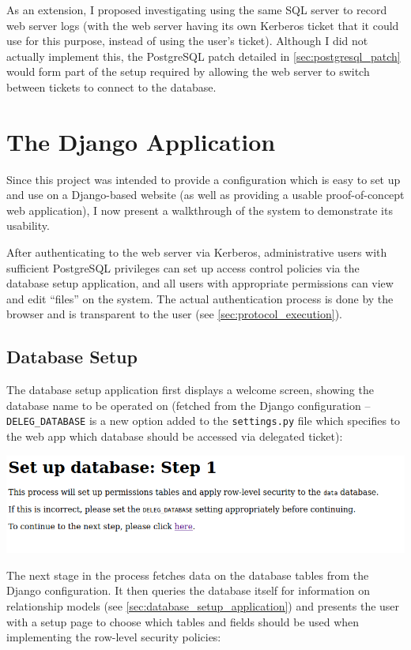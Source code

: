 \documentclass[12pt]{report}
\begin{document}
As an extension, I proposed investigating using the same SQL server to record web server logs (with the web server having its own Kerberos ticket that it could use for this purpose, instead of using the user's ticket). Although I did not actually implement this, the PostgreSQL patch detailed in \autoref{sec:postgresql_patch} would form part of the setup required by allowing the web server to switch between tickets to connect to the database.

\section{The Django Application}
Since this project was intended to provide a configuration which is easy to set up and use on a Django-based website (as well as providing a usable proof-of-concept web application), I now present a walkthrough of the system to demonstrate its usability.

After authenticating to the web server via Kerberos, administrative users with sufficient PostgreSQL privileges can set up access control policies via the database setup application, and all users with appropriate permissions can view and edit ``files'' on the system. The actual authentication process is done by the browser and is transparent to the user (see \autoref{sec:protocol_execution}).

\subsection{Database Setup}
The database setup application first displays a welcome screen, showing the database name to be operated on (fetched from the Django configuration -- \verb+DELEG_DATABASE+ is a new option added to the \verb+settings.py+ file which specifies to the web app which database should be accessed via delegated ticket):

\begin{center}
  \includegraphics[scale=0.5]{02-setup1.png}
\end{center}

The next stage in the process fetches data on the database tables from the Django configuration. It then queries the database itself for information on relationship models (see \autoref{sec:database_setup_application}) and presents the user with a setup page to choose which tables and fields should be used when implementing the row-level security policies:
\end{document}
